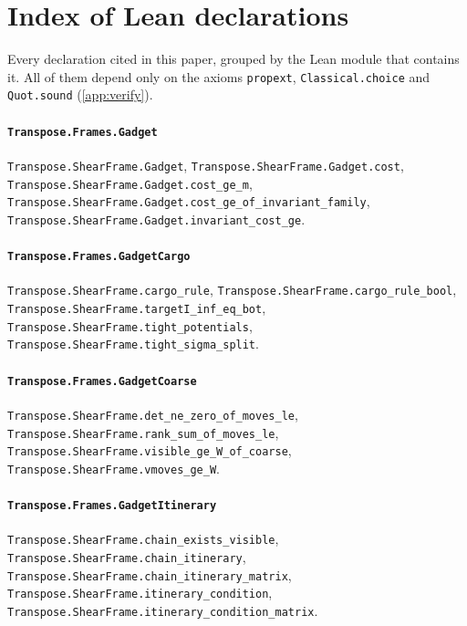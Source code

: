 \section{Index of Lean declarations}\label{app:index}

Every declaration cited in this paper, grouped by the Lean module that contains it. All of them
depend only on the axioms \texttt{propext}, \texttt{Classical.choice} and \texttt{Quot.sound}
(\cref{app:verify}).

\paragraph{\texttt{Transpose.Frames.Gadget}}
{\small\raggedright \texttt{Transpose.ShearFrame.Gadget}, \texttt{Transpose.ShearFrame.Gadget.cost}, \texttt{Transpose.ShearFrame.Gadget.cost\_ge\_m}, \texttt{Transpose.ShearFrame.Gadget.cost\_ge\_of\_invariant\_family}, \texttt{Transpose.ShearFrame.Gadget.invariant\_cost\_ge}.\par}

\paragraph{\texttt{Transpose.Frames.GadgetCargo}}
{\small\raggedright \texttt{Transpose.ShearFrame.cargo\_rule}, \texttt{Transpose.ShearFrame.cargo\_rule\_bool}, \texttt{Transpose.ShearFrame.targetI\_inf\_eq\_bot}, \texttt{Transpose.ShearFrame.tight\_potentials}, \texttt{Transpose.ShearFrame.tight\_sigma\_split}.\par}

\paragraph{\texttt{Transpose.Frames.GadgetCoarse}}
{\small\raggedright \texttt{Transpose.ShearFrame.det\_ne\_zero\_of\_moves\_le}, \texttt{Transpose.ShearFrame.rank\_sum\_of\_moves\_le}, \texttt{Transpose.ShearFrame.visible\_ge\_W\_of\_coarse}, \texttt{Transpose.ShearFrame.vmoves\_ge\_W}.\par}

\paragraph{\texttt{Transpose.Frames.GadgetItinerary}}
{\small\raggedright \texttt{Transpose.ShearFrame.chain\_exists\_visible}, \texttt{Transpose.ShearFrame.chain\_itinerary}, \texttt{Transpose.ShearFrame.chain\_itinerary\_matrix}, \texttt{Transpose.ShearFrame.itinerary\_condition}, \texttt{Transpose.ShearFrame.itinerary\_condition\_matrix}.\par}

